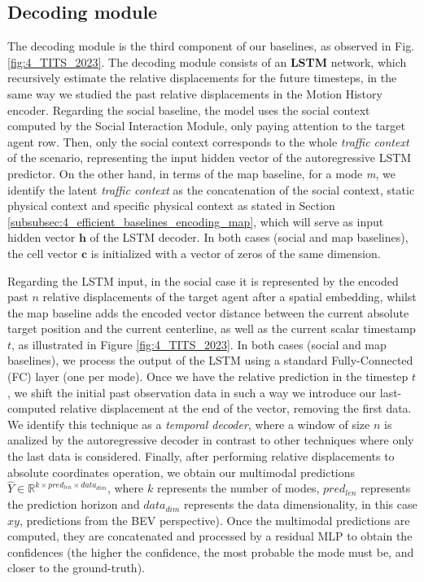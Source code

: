\subsection{Decoding module}
\label{subsubsec:4_efficient_baselines_decoding_modules}

The decoding module is the third component of our baselines, as observed in Fig. \ref{fig:4_TITS_2023}. The decoding module consists of an \textbf{LSTM} network, which recursively estimate the relative displacements for the future timesteps, in the same way we studied the past relative displacements in the Motion History encoder. Regarding the social baseline, the model uses the social context computed by the Social Interaction Module, only paying attention to the target agent row. Then, only the social context corresponds to the whole \textit{traffic context} of the scenario, representing the input hidden vector of the autoregressive LSTM predictor. On the other hand, in terms of the map baseline, for a mode \textit{m}, we identify the latent \textit{traffic context} as the concatenation of the social context, static physical context and specific physical context as stated in Section \ref{subsubsec:4_efficient_baselines_encoding_map}, which will serve as input hidden vector $\mathbf{h}$ of the LSTM decoder. In both cases (social and map baselines), the cell vector $\mathbf{c}$ is initialized with a vector of zeros of the same dimension. 

Regarding the LSTM input, in the social case it is represented by the encoded past $n$ relative displacements of the target agent after a spatial embedding, whilst the map baseline adds the encoded vector distance between the current absolute target position and the current centerline, as well as the current scalar timestamp $t$, as illustrated in Figure \ref{fig:4_TITS_2023}. In both cases (social and map baselines), we process the output of the LSTM using a standard Fully-Connected (FC) layer (one per mode). Once we have the relative prediction in the timestep $t$, we shift the initial past observation data in such a way we introduce our last-computed relative displacement at the end of the vector, removing the first data. We identify this technique as a \textit{temporal decoder}, where a window of size $n$ is analized by the autoregressive decoder in contrast to other techniques \cite{dendorfer2020goal, sadeghian2019sophie, gupta2018social} where only the last data is considered. Finally, after performing relative displacements to absolute coordinates operation, we obtain our multimodal predictions $\hat{Y} \in \mathbb{R}^{k \times pred_{len} \times data_{dim}}$, where $k$ represents the number of modes, $pred_{len}$ represents the prediction horizon and $data_{dim}$ represents the data dimensionality, in this case $xy$, predictions from the BEV perspective). Once the multimodal predictions are computed, they are concatenated and processed by a residual MLP to obtain the confidences (the higher the confidence, the most probable the mode must be, and closer to the ground-truth).

